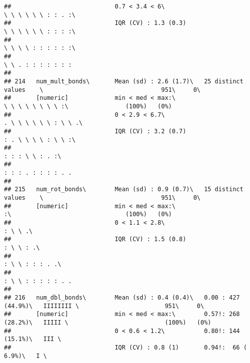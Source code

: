 \documentclass[]{article}
\begin{document}
\begin{verbatim}
##                             0.7 < 3.4 < 6\                                 \ \ \ \ \ \ : : . :\                                
##                             IQR (CV) : 1.3 (0.3)                           \ \ \ \ \ \ : : : :\                                
##                                                                            \ \ \ \ : : : : : :\                                
##                                                                            \ \ . : : : : : : :                                 
## 
## 214   num_mult_bonds\       Mean (sd) : 2.6 (1.7)\   25 distinct values    \                                 951\     0\       
##       [numeric]             min < med < max:\                              \ \ \ \ \ \ \ \ :\                (100%)   (0%)     
##                             0 < 2.9 < 6.7\                                 . \ \ \ \ \ \ : \ \ .\                              
##                             IQR (CV) : 3.2 (0.7)                           : . \ \ \ \ : \ \ :\                                
##                                                                            : : : \ \ : . :\                                    
##                                                                            : : : . : : : : . .                                 
## 
## 215   num_rot_bonds\        Mean (sd) : 0.9 (0.7)\   15 distinct values    \                                 951\     0\       
##       [numeric]             min < med < max:\                              :\                                (100%)   (0%)     
##                             0 < 1.1 < 2.8\                                 : \ \ .\                                            
##                             IQR (CV) : 1.5 (0.8)                           : \ \ : .\                                          
##                                                                            : \ \ : : : . .\                                    
##                                                                            : \ \ : : : : : . .                                 
## 
## 216   num_dbl_bonds\        Mean (sd) : 0.4 (0.4)\   0.00 : 427 (44.9%)\   IIIIIIII \                        951\     0\       
##       [numeric]             min < med < max:\        0.57!: 268 (28.2%)\   IIIII \                           (100%)   (0%)     
##                             0 < 0.6 < 1.2\           0.80!: 144 (15.1%)\   III \                                               
##                             IQR (CV) : 0.8 (1)       0.94!:  66 ( 6.9%)\   I \                                                 

\end{verbatim}
\end{document}
